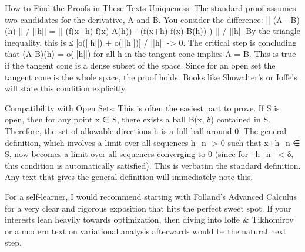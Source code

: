\documentclass{book}
\begin{document}
How to Find the Proofs in These Texts
Uniqueness: The standard proof assumes two candidates for the derivative, A and B. You consider the difference:
|| (A - B)(h) || / ||h|| = || (f(x+h)-f(x)-A(h)) - (f(x+h)-f(x)-B(h)) ) || / ||h||
By the triangle inequality, this is ≤ [o(||h||) + o(||h||)] / ||h|| -> 0.
The critical step is concluding that (A-B)(h) = o(||h||) for all h in the tangent cone implies A = B. This is true if the tangent cone is a dense subset of the space. Since for an open set the tangent cone is the whole space, the proof holds. Books like Showalter's or Ioffe's will state this condition explicitly.

Compatibility with Open Sets: This is often the easiest part to prove. If S is open, then for any point x ∈ S, there exists a ball B(x, δ) contained in S. Therefore, the set of allowable directions h is a full ball around 0. The general definition, which involves a limit over all sequences h_n -> 0 such that x+h_n ∈ S, now becomes a limit over all sequences converging to 0 (since for ||h_n|| < δ, this condition is automatically satisfied). This is verbatim the standard definition. Any text that gives the general definition will immediately note this.

For a self-learner, I would recommend starting with Folland's Advanced Calculus for a very clear and rigorous exposition that hits the perfect sweet spot. If your interests lean heavily towards optimization, then diving into Ioffe & Tikhomirov or a modern text on variational analysis afterwards would be the natural next step.
\end{document}
